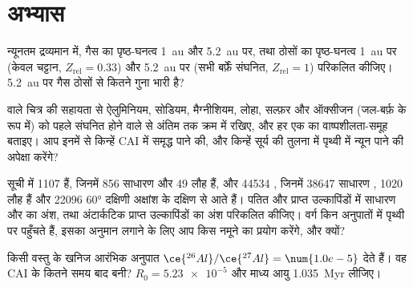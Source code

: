 \section{अभ्यास}

\begin{exercise}[$\star$]\label{exo:b2:planet-formation-meteorites:1}
न्यूनतम द्रव्यमान  में, गैस का पृष्ठ-घनत्व
\qty{1}{au} और \qty{5.2}{au} पर, तथा ठोसों का पृष्ठ-घनत्व
\qty{1}{au} पर (केवल चट्टान, $Z_{\mathrm{rel}} = 0.33$) और \qty{5.2}{au} पर (सभी बर्फ़ें
संघनित, $Z_{\mathrm{rel}} = 1$) परिकलित कीजिए। \qty{5.2}{au} पर गैस ठोसों से कितने
गुना भारी है?
\end{exercise}

\begin{exercise}[$\star$]\label{exo:b2:planet-formation-meteorites:2}
 वाले चित्र की सहायता से ऐलुमिनियम, सोडियम,
मैग्नीशियम, लोहा, सल्फ़र और ऑक्सीजन (जल-बर्फ़ के रूप में) को पहले संघनित होने वाले से
अंतिम तक क्रम में रखिए, और हर एक का वाष्पशीलता-समूह बताइए। आप इनमें से किन्हें
CAI में समृद्ध पाने की, और किन्हें सूर्य की तुलना में पृथ्वी में न्यून पाने की अपेक्षा करेंगे?
\end{exercise}

\begin{exercise}[$\star$]\label{exo:b2:planet-formation-meteorites:3}
सूची में \num{1107}  हैं, जिनमें 856 साधारण  और
49 लौह हैं, और \num{44534} , जिनमें \num{38647} साधारण ,
\num{1020} लौह हैं और \num{22096} \ang{60} दक्षिणी अक्षांश के दक्षिण से आते हैं। पतित और
प्राप्त उल्कापिंडों में साधारण  और  का अंश, तथा अंटार्कटिक
प्राप्त उल्कापिंडों का अंश परिकलित कीजिए। वर्ग किन अनुपातों में पृथ्वी पर पहुँचते हैं, इसका अनुमान लगाने के लिए
आप किस नमूने का प्रयोग करेंगे, और क्यों?
\end{exercise}

\begin{exercise}[$\star$]\label{exo:b2:planet-formation-meteorites:4}
किसी वस्तु के खनिज आरंभिक अनुपात
$\ce{^{26}Al}/\ce{^{27}Al} = \num{1.0e-5}$ देते हैं। वह CAI के कितने समय बाद बनी?
$R_0 = \num{5.23e-5}$ और माध्य आयु \qty{1.035}{Myr} लीजिए।
\end{exercise}

